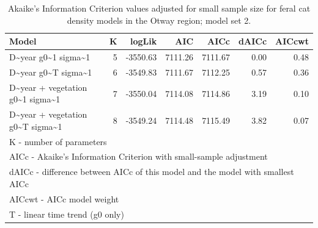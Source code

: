 \documentclass[]{elsarticle} %
\begin{document}
\begin{longtable}[t]{lrrrrrr}
\caption{\label{tab:density-aic-o-2}Akaike's Information Criterion values adjusted for small sample size for feral cat density models in the Otway region; model set 2.}\\
\toprule
Model & K & logLik & AIC & AICc & dAICc & AICcwt\\
\midrule
D\textasciitilde{}year g0\textasciitilde{}1 sigma\textasciitilde{}1 & 5 & -3550.63 & 7111.26 & 7111.67 & 0.00 & 0.48\\
D\textasciitilde{}year g0\textasciitilde{}T sigma\textasciitilde{}1 & 6 & -3549.83 & 7111.67 & 7112.25 & 0.57 & 0.36\\
D\textasciitilde{}year + vegetation g0\textasciitilde{}1 sigma\textasciitilde{}1 & 7 & -3550.04 & 7114.08 & 7114.86 & 3.19 & 0.10\\
D\textasciitilde{}year + vegetation g0\textasciitilde{}T sigma\textasciitilde{}1 & 8 & -3549.24 & 7114.48 & 7115.49 & 3.82 & 0.07\\
\bottomrule
\multicolumn{7}{l}{\rule{0pt}{1em}K - number of parameters}\\
\multicolumn{7}{l}{\rule{0pt}{1em}AICc - Akaike's Information Criterion with small-sample adjustment}\\
\multicolumn{7}{l}{\rule{0pt}{1em}dAICc - difference between AICc of this model and the model with smallest AICc}\\
\multicolumn{7}{l}{\rule{0pt}{1em}AICcwt - AICc model weight}\\
\multicolumn{7}{l}{\rule{0pt}{1em}T - linear time trend (g0 only)}\\
\end{longtable}
\endgroup{}

\newpage

\begingroup\fontsize{10}{12}\selectfont
\end{document}

